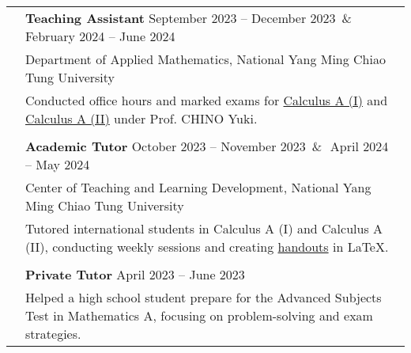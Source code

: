 \documentclass[letterpaper, 11pt]{article}
\newcommand{\spaceand}{\,\&\ \,}
\begin{document}
\begin{center}
\begin{longtable}{p{0.76in}p{5.93in}}
        & \textbf{Teaching Assistant}  \hfill September 2023 -- December 2023 \spaceand February 2024 -- June 2024 \\
        & Department of Applied Mathematics, National Yang Ming Chiao Tung University\\
        & Conducted office hours and marked exams for \href{https://reurl.cc/Djp5jN}{Calculus A (I)} and \href{https://reurl.cc/RqoMez}{Calculus A (II)} under Prof. CHINO Yuki.\\
        & \\

        & \textbf{Academic Tutor} \hfill October 2023 -- November 2023 \spaceand April 2024 -- May 2024\\
        & Center of Teaching and Learning Development, National Yang Ming Chiao Tung University\\
        & Tutored international students in Calculus A (I) and Calculus A (II), conducting weekly sessions and creating \href{https://github.com/eiken59/2024_II_Tutor}{handouts} in \LaTeX.\\
        & \\

        & \textbf{Private Tutor} \hfill April 2023 -- June 2023 \\
        & Helped a high school student prepare for the Advanced Subjects Test in Mathematics A, focusing on problem-solving and exam strategies.\\




        
        
    \end{longtable}
\end{center}
\end{document}
